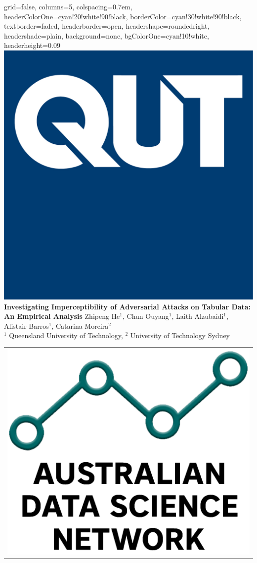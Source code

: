 \documentclass[portrait,a0paper,margin=17mm,fontscale=0.292]{baposter}
\begin{document}
\begin{poster}{
 grid=false,
 columns=5,
 colspacing=0.7em,
 headerColorOne=cyan!20!white!90!black,
 borderColor=cyan!30!white!90!black,
 textborder=faded,
 headerborder=open,
 headershape=roundedright,
 headershade=plain,
 background=none,
 bgColorOne=cyan!10!white,
 headerheight=0.09\textheight}
 {
      \includegraphics[width=0.08\linewidth]{qut-logo-og-1200.jpg}
 }
 {
 {\sc\huge\bf Investigating Imperceptibility of Adversarial Attacks on Tabular Data: An Empirical Analysis}}
 {Zhipeng He$^1$, Chun Ouyang$^1$, Laith Alzubaidi$^1$, Alistair Barros$^1$, Catarina Moreira$^2$ \\[0.2em]
 {$^1$ Queensland University of Technology, $^2$ University of Technology Sydney}}
 {
    \begin{tabular}{r}
        \includegraphics[width=0.08\linewidth]{ADSN-Logo-Black-Stacked.png}
    \end{tabular}
 }



\end{poster}
\end{document}
